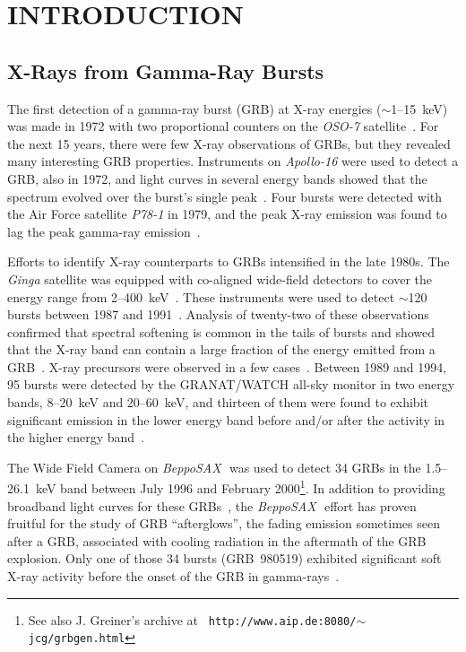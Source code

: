 \documentclass{aastex}
\def\sax{{\it BeppoSAX\,}}
\begin{document}

\section{INTRODUCTION\label{sec:intro}}

\subsection{X-Rays from Gamma-Ray Bursts}

The first detection of a gamma-ray burst (GRB) at X-ray energies
($\sim$1--15~keV) was made in 1972 with two proportional counters on
the {\it OSO-7} satellite~\citep{wubde73}.  For the next 15 years,
there were few X-ray observations of GRBs, but they revealed many
interesting GRB properties.  Instruments on {\it Apollo-16} were used
to detect a GRB, also in 1972, and light curves in several energy
bands showed that the spectrum evolved 
over the burst's single peak~\citep{mpgpt74,tesam74}.  Four bursts
were detected with the Air Force satellite {\it P78-1} in 1979, and
the peak X-ray emission was found to lag the peak gamma-ray
emission~\citep{lefks84}.  

Efforts to identify X-ray counterparts to GRBs intensified in the late
1980s.  The {\it Ginga} satellite was equipped with co-aligned
wide-field detectors to cover the energy range from
2--400~keV~\citep{mfhin89}.  These instruments were used to detect
$\sim$120 bursts between 1987 and 1991~\citep{omnyf91}.  Analysis of
twenty-two of these observations confirmed that spectral softening is
common in the tails of bursts and showed that the X-ray band can
contain a large fraction of the energy emitted from a
GRB~\citep{sfmy98}.  X-ray precursors were observed in a few
cases~\citep{minpf91}.  Between 1989 and 1994, 95 bursts were detected
by the GRANAT/WATCH all-sky monitor in two energy bands, 8--20~keV and
20--60~keV, and thirteen of them were found to exhibit significant
emission in the lower energy band before and/or after the activity in
the higher energy band~\citep{sstlb98}.

The Wide Field Camera on \sax~was used to detect 34 GRBs in the
1.5--26.1~keV band between July 1996 and February 2000\footnote{See
also J. Greiner's archive at {\tt
http://www.aip.de:8080/$\sim$jcg/grbgen.html}}.  In addition to
providing broadband light curves for these GRBs~\citep{facmp00}, the
\sax~effort has proven fruitful for the study of GRB ``afterglows'',
the fading emission sometimes seen after a GRB, associated with
cooling radiation in the aftermath of the GRB explosion.  Only one of
those 34 bursts (GRB~980519) exhibited significant soft X-ray activity
before the onset of the GRB in gamma-rays~\citep{zhpf99}.
\end{document}

